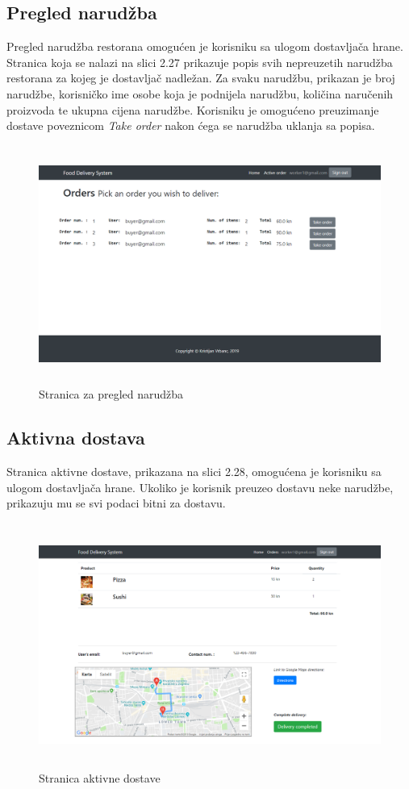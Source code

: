 \documentclass[times, utf8, zavrsni, numeric]{fer}
\begin{document}
\subsection{Pregled narudžba}
Pregled narudžba restorana omogućen je korisniku sa ulogom dostavljača hrane. Stranica koja se nalazi na slici 2.27 prikazuje popis svih nepreuzetih narudžba restorana za kojeg je dostavljač nadležan. Za svaku narudžbu, prikazan je broj narudžbe, korisničko ime osobe koja je podnijela narudžbu, količina naručenih proizvoda te ukupna cijena narudžbe. Korisniku je omogućeno preuzimanje dostave poveznicom \emph{Take order} nakon ćega se narudžba uklanja sa popisa.
\begin{figure}[htb]
\centering
\includegraphics[height=7.8cm]{narudzbe.png}
\caption{Stranica za pregled narudžba}
\label{fig:nar}
\end{figure}
\subsection{Aktivna dostava}
Stranica aktivne dostave, prikazana na slici 2.28, omogućena je korisniku sa ulogom dostavljača hrane. Ukoliko je korisnik preuzeo dostavu neke narudžbe, prikazuju mu se svi podaci bitni za dostavu.
\begin{figure}[htb]
\centering
\includegraphics[height=8.0cm]{aktivna.png}
\caption{Stranica aktivne dostave}
\label{fig:nar}
\end{figure}
\end{document}
